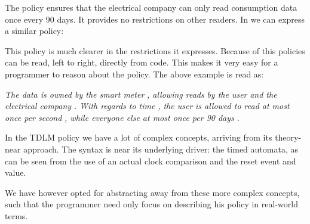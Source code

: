 The policy ensures that the electrical company can only read consumption data once every 90 days.
It provides no restrictions on other readers.
In \thelang{} we can express a similar policy:

\begin{center}
\end{center}

This policy is much clearer in the restrictions it expresses.
Because of this \thelang{} policies can be read, left to right, directly from code.
This makes it very easy for a programmer to reason about the policy.
The above example is read as:

\begin{adjustwidth}{1cm}{1cm}
\begin{center}
\textit{The data is owned by the smart meter }\textit{, allowing reads }\dlmc{->}\textit{ by the user }\textit{ and the electrical company }\textit{.
With regards to time }\textit{, the user }\textit{ is allowed to read at most once per second }\textit{, while everyone else at most once per 90 days }\textit{.}
\end{center}
\end{adjustwidth}

In the TDLM policy we have a lot of complex concepts, arriving from its theory-near approach.
The syntax is near its underlying driver: the timed automata, as can be seen from the use of an actual clock comparison and the reset event and value.

We have however opted for abstracting away from these more complex concepts, such that the programmer need only focus on describing his policy in real-world terms.
